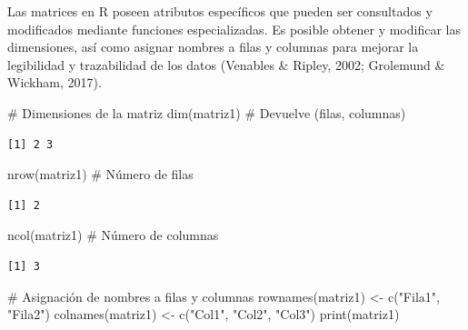 \documentclass[
  spanish,
  a4paper,
  DIV=11,
  numbers=noendperiod,
  onepage,
  openany]{scrreprt}
\newenvironment{Shaded}{\begin{snugshade}}{\end{snugshade}}
\newcommand{\CommentTok}[1]{\textcolor[rgb]{0.37,0.37,0.37}{#1}}
\newcommand{\FunctionTok}[1]{\textcolor[rgb]{0.28,0.35,0.67}{#1}}
\newcommand{\NormalTok}[1]{\textcolor[rgb]{0.00,0.23,0.31}{#1}}
\newcommand{\OtherTok}[1]{\textcolor[rgb]{0.00,0.23,0.31}{#1}}
\newcommand{\StringTok}[1]{\textcolor[rgb]{0.13,0.47,0.30}{#1}}
\begin{document}
Las matrices en R poseen atributos específicos que pueden ser
consultados y modificados mediante funciones especializadas. Es posible
obtener y modificar las dimensiones, así como asignar nombres a filas y
columnas para mejorar la legibilidad y trazabilidad de los datos
(Venables \& Ripley, 2002; Grolemund \& Wickham, 2017).

\begin{Shaded}
\begin{Highlighting}[]
\CommentTok{\# Dimensiones de la matriz}
\FunctionTok{dim}\NormalTok{(matriz1)      }\CommentTok{\# Devuelve (filas, columnas)}
\end{Highlighting}
\end{Shaded}

\begin{verbatim}
[1] 2 3
\end{verbatim}

\begin{Shaded}
\begin{Highlighting}[]
\FunctionTok{nrow}\NormalTok{(matriz1)     }\CommentTok{\# Número de filas}
\end{Highlighting}
\end{Shaded}

\begin{verbatim}
[1] 2
\end{verbatim}

\begin{Shaded}
\begin{Highlighting}[]
\FunctionTok{ncol}\NormalTok{(matriz1)     }\CommentTok{\# Número de columnas}
\end{Highlighting}
\end{Shaded}

\begin{verbatim}
[1] 3
\end{verbatim}

\begin{Shaded}
\begin{Highlighting}[]
\CommentTok{\# Asignación de nombres a filas y columnas}
\FunctionTok{rownames}\NormalTok{(matriz1) }\OtherTok{\textless{}{-}} \FunctionTok{c}\NormalTok{(}\StringTok{"Fila1"}\NormalTok{, }\StringTok{"Fila2"}\NormalTok{)}
\FunctionTok{colnames}\NormalTok{(matriz1) }\OtherTok{\textless{}{-}} \FunctionTok{c}\NormalTok{(}\StringTok{"Col1"}\NormalTok{, }\StringTok{"Col2"}\NormalTok{, }\StringTok{"Col3"}\NormalTok{)}
\FunctionTok{print}\NormalTok{(matriz1)}
\end{Highlighting}
\end{Shaded}
\end{document}
